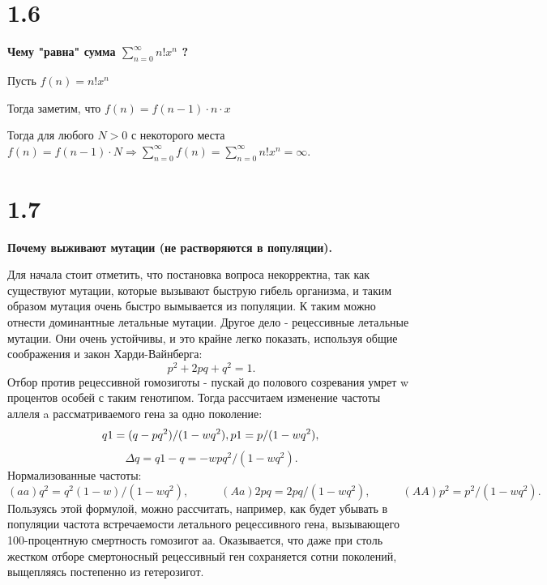 \documentclass[a4paper,14pt]{article}
\begin{document}
\section*{1.6}
\begin{center}
	\LARGE{\textbf{Чему "равна" сумма $\sum\limits_{n = 0}^{\infty}  n! x^n$ ?}}\\
\end{center}

Пусть $f(n) = n! x^n$

Тогда заметим, что $f(n) = f(n-1) \cdot n \cdot x$

Тогда для любого $N > 0$ с некоторого места $f(n) = f(n-1) \cdot N \Rightarrow \sum\limits_{n = 0}^{\infty} f(n) = \sum\limits_{n = 0}^{\infty}  n! x^n = \infty.$ 

\section*{1.7}
\begin{center}
	\LARGE{\textbf{Почему выживают мутации (не растворяются в популяции).}}\\
\end{center}
Для начала стоит отметить, что постановка вопроса некорректна, так как существуют мутации, которые вызывают быструю гибель организма, и таким образом мутация очень быстро вымывается из популяции. К таким можно отнести доминантные летальные мутации.
Другое дело - рецессивные летальные мутации. Они очень устойчивы, и это крайне легко показать, используя общие соображения и закон Харди-Вайнберга:
\begin{equation*}
p^2 + 2pq + q^2 = 1.
\end{equation*}
Отбор против рецессивной гомозиготы - пускай до полового созревания умрет w процентов особей с таким генотипом. Тогда рассчитаем изменение частоты аллеля a рассматриваемого гена за одно поколение: 
\begin{equation*}
q1 = (q - pq^2) / (1 - wq^2), p1 =  p / (1 - wq^2),\\
\end{equation*}
\begin{equation*}
\Delta q = q1 - q =  - wpq^2  / (1 -wq^2).
\end{equation*}
Нормализованные частоты:
\begin{equation*}
(aa)  q^2=q^2(1-w)/(1-wq^2),\;\;\;\;\;\;\;\;\;\;(Aa) 2pq=2pq/ (1-wq^2),\;\;\;\;\;\;\;\;\;\;(AA) p^2=p^2/(1-wq^2).
\end{equation*}
Пользуясь этой формулой, можно рассчи­тать, например, как будет убывать в популяции частота встреча­емости летального рецессивного гена, вызывающего 100-процентную смертность гомозигот аа. Оказывается, что даже при столь жестком отборе смертоносный рецессивный ген сохраняется сотни поколений, выщепляясь постепенно из гетерозигот.
\end{document}
